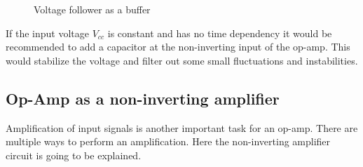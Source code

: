 \begin{figure}[htb]
	\centering
	\caption{Voltage follower as a buffer}
	\label{fig:attenuator-buffer}
\end{figure}

If the input voltage $V_{cc}$ is constant and has no time dependency it would be recommended to add a capacitor at the non-inverting input of the op-amp. This would stabilize the voltage and filter out some small fluctuations and instabilities.

\subsection{Op-Amp as a non-inverting amplifier}

Amplification of input signals is another important task for an op-amp. There are multiple ways to perform an amplification. Here the non-inverting amplifier circuit is going to be explained.


